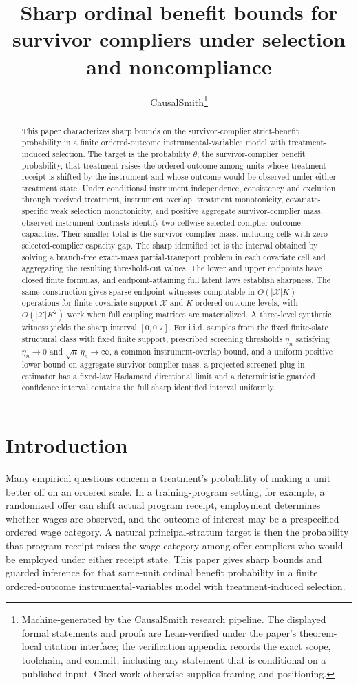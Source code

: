 \documentclass[11pt]{article}
\title{Sharp ordinal benefit bounds for survivor compliers under selection and noncompliance}
\author{CausalSmith\thanks{Machine-generated by the CausalSmith research pipeline. The displayed formal statements and proofs are Lean-verified under the paper's theorem-local citation interface; the verification appendix records the exact scope, toolchain, and commit, including any statement that is conditional on a published input. Cited work otherwise supplies framing and positioning.}}
\date{\cspaperdate}
\begin{document}
\maketitle

\begin{abstract}
This paper characterizes sharp bounds on the survivor-complier strict-benefit probability in a finite ordered-outcome instrumental-variables model with treatment-induced selection.  The target is the probability \(\theta\), the survivor-complier benefit probability, that treatment raises the ordered outcome among units whose treatment receipt is shifted by the instrument and whose outcome would be observed under either treatment state.  Under conditional instrument independence, consistency and exclusion through received treatment, instrument overlap, treatment monotonicity, covariate-specific weak selection monotonicity, and positive aggregate survivor-complier mass, observed instrument contrasts identify two cellwise selected-complier outcome capacities.  Their smaller total is the survivor-complier mass, including cells with zero selected-complier capacity gap.  The sharp identified set is the interval obtained by solving a branch-free exact-mass partial-transport problem in each covariate cell and aggregating the resulting threshold-cut values.  The lower and upper endpoints have closed finite formulas, and endpoint-attaining full latent laws establish sharpness.  The same construction gives sparse endpoint witnesses computable in \(O(|\mathcal X|K)\) operations for finite covariate support \(\mathcal X\) and \(K\) ordered outcome levels, with \(O(|\mathcal X|K^2)\) work when full coupling matrices are materialized.  A three-level synthetic witness yields the sharp interval \([0,0.7]\).  For i.i.d. samples from the fixed finite-slate structural class with fixed finite support, prescribed screening thresholds \(\eta_n\) satisfying \(\eta_n\to0\) and \(\sqrt n\,\eta_n\to\infty\), a common instrument-overlap bound, and a uniform positive lower bound on aggregate survivor-complier mass, a projected screened plug-in estimator has a fixed-law Hadamard directional limit and a deterministic guarded confidence interval contains the full sharp identified interval uniformly.
\end{abstract}

\section{Introduction}

Many empirical questions concern a treatment's probability of making a unit better off on an ordered scale.  In a training-program setting, for example, a randomized offer can shift actual program receipt, employment determines whether wages are observed, and the outcome of interest may be a prespecified ordered wage category.  A natural principal-stratum target is then the probability that program receipt raises the wage category among offer compliers who would be employed under either receipt state.  This paper gives sharp bounds and guarded inference for that same-unit ordinal benefit probability in a finite ordered-outcome instrumental-variables model with treatment-induced selection.
\end{document}
